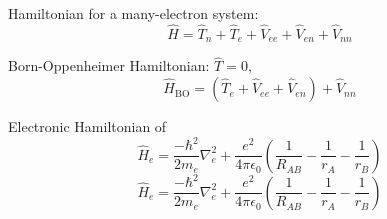 Hamiltonian for a many-electron system:
$$\hat{H} = \hat{T}_{n} + \hat{T}_{e} + \hat{V}_{ee} + \hat{V}_{en} + \hat{V}_{nn}$$

Born-Oppenheimer Hamiltonian: $\hat{T} = 0$,
$$\hat{H}_{\mathrm{BO}} = \left( \hat{T}_{e} + \hat{V}_{ee} + \hat{V}_{en} \right) + \hat{V}_{nn}$$

Electronic Hamiltonian of 
\begin{equation*}
    \hat{H}_e = \frac{-\hbar^2}{2m_e}\nabla^2_e + \frac{e^2}{4\pi\epsilon_0} \left( \frac{1}{R_{AB}} - \frac{1}{r_{A}} - \frac{1}{r_{B}} \right)
\end{equation*}
\begin{equation*}
    \hat{H}_e = \frac{-\hbar^2}{2m_e}\nabla^2_e + \frac{e^2}{4\pi\epsilon_0} \left( \frac{1}{R_{AB}} - \frac{1}{r_{A}} - \frac{1}{r_{B}} \right)
\end{equation*}